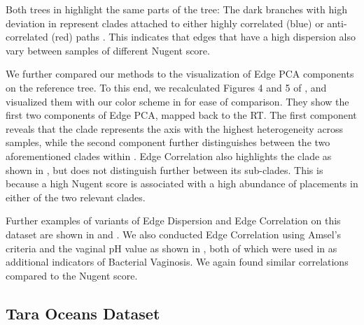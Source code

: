 Both trees in  highlight the same parts of the tree:
The dark branches with high deviation in  represent clades
attached to either highly correlated (blue) or anti-correlated (red) paths .
This indicates that edges that have a high dispersion
also vary between samples of different Nugent score.

We further compared our methods to the visualization of Edge PCA components on the reference tree.
To this end, we recalculated Figures 4 and 5 of \cite{Matsen2011a},
and visualized them with our color scheme in  for ease of comparison.
They show the first two components of Edge PCA, mapped back to the \ac{RT}.
The first component %
reveals that the  clade represents the axis with the highest heterogeneity across samples,
while the second component%
further distinguishes between the two aforementioned clades within .
Edge Correlation also highlights the  clade as shown in ,
but does not distinguish further between its sub-clades.
This is because a high Nugent score is associated
with a high abundance of placements in either of the two relevant  clades.

Further examples of variants of Edge Dispersion and Edge Correlation on this dataset
are shown in  and .
We also conducted Edge Correlation using Amsel's criteria \cite{Amsel1983} and the vaginal pH value as shown in ,
both of which were used in \cite{Srinivasan2012} as additional indicators of Bacterial Vaginosis.
We again found similar correlations compared to the Nugent score.


\subsection{Tara Oceans Dataset}
\label{ch:Visualization:sec:Results:sub:TaraDataset}

